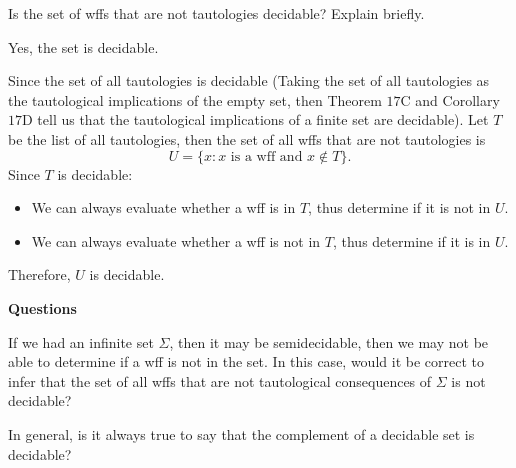 \documentclass[english, 11pt]{amsart}
\begin{document}
\setlength{\headheight}{13.0pt}
\setlength{\footskip}{15.0pt}


  \begin{problem}
    Is the set of wffs that are not tautologies decidable?
    Explain briefly.
  \end{problem}
  \begin{Answer}
    Yes, the set is decidable.
    
    \step
    Since the set of all tautologies is decidable
    (Taking the set of all tautologies
    as the tautological implications of the empty set,
    then Theorem $17$C and Corollary $17$D tell us that
    the tautological implications of a finite set are decidable).
    Let $T$ be the list of all tautologies, then
    the set of all wffs that are not tautologies is
    \[
      U = \{ x : x \text{ is a wff and } x \notin T \}.  
    \]
    Since $T$ is decidable:
    \begin{itemize}
      \item We can always evaluate whether a wff is in $T$,
        thus determine if it is not in $U$.
      \item We can always evaluate whether a wff is not in $T$,
        thus determine if it is in $U$.
    \end{itemize}
    Therefore, $U$ is decidable.

  \end{Answer}
    \step
    \begin{blockcolor}
      \begin{center}\textbf{Questions} \end{center}

      \step
      If we had an infinite set $\Sigma$,
      then it may be semidecidable, then we may not
      be able to determine if a wff is not in the set.
      In this case, would it be correct to infer that the set of all wffs
      that are not tautological consequences of $\Sigma$
      is not decidable?

      \step
      In general, is it always true to say that the complement of a
      decidable set is decidable?
    \end{blockcolor}
\bigskip
\end{document}

